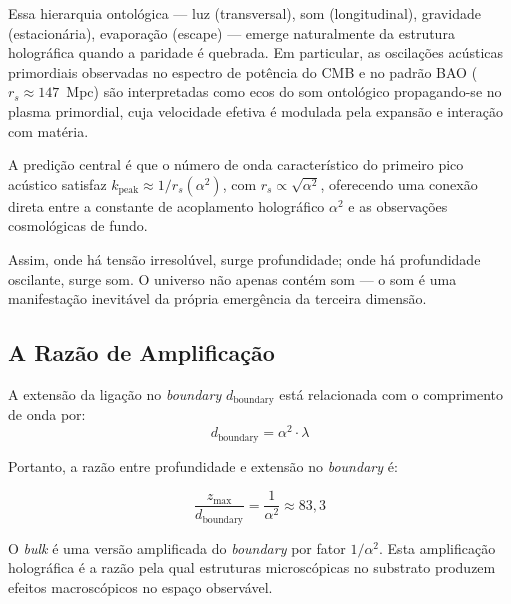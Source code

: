\documentclass[12pt,a4paper,twoside]{article}
\newcommand{\alphaii}{\alpha^{2}}
\newcommand{\boundary}{\textit{boundary}}
\newcommand{\bulk}{\textit{bulk}}
\begin{document}
Essa hierarquia ontol\'ogica --- luz (transversal), som (longitudinal), gravidade (estacion\'aria), evapora\c{c}\~ao (escape) --- emerge naturalmente da estrutura hologr\'afica quando a paridade \'e quebrada. Em particular, as oscila\c{c}\~oes ac\'usticas primordiais observadas no espectro de pot\^encia do CMB e no padr\~ao BAO ($r_s \approx 147$~Mpc) s\~ao interpretadas como ecos do som ontol\'ogico propagando-se no plasma primordial, cuja velocidade efetiva \'e modulada pela expans\~ao e intera\c{c}\~ao com mat\'eria.

A predi\c{c}\~ao central \'e que o n\'umero de onda caracter\'istico do primeiro pico ac\'ustico satisfaz $k_{\text{peak}} \approx 1/r_s(\alphaii)$, com $r_s \propto \sqrt{\alphaii}$, oferecendo uma conex\~ao direta entre a constante de acoplamento hologr\'afico $\alphaii$ e as observa\c{c}\~oes cosmol\'ogicas de fundo.

Assim, onde h\'a tens\~ao irresol\'uvel, surge profundidade; onde h\'a profundidade oscilante, surge som. O universo n\~ao apenas cont\'em som --- o som \'e uma manifesta\c{c}\~ao inevit\'avel da pr\'opria emerg\^encia da terceira dimens\~ao.

\subsection{A Raz\~ao de Amplifica\c{c}\~ao}

A extens\~ao da liga\c{c}\~ao no \boundary{} $d_{\text{boundary}}$ est\'a relacionada com o comprimento de onda por:
\begin{equation}
d_{\text{boundary}} = \alphaii\cdot\lambda
\label{eq:d_boundary}
\end{equation}

Portanto, a raz\~ao entre profundidade e extens\~ao no \boundary{} \'e:
\begin{equationbox}[title={Amplifica\c{c}\~ao Hologr\'afica}]
\begin{equation}
\frac{z_{\max}}{d_{\text{boundary}}} = \frac{1}{\alphaii} \approx 83{,}3
\label{eq:amplificacao}
\end{equation}
\end{equationbox}

\noindent O \bulk{} \'e uma vers\~ao amplificada do \boundary{} por fator $1/\alphaii$. Esta amplifica\c{c}\~ao hologr\'afica \'e a raz\~ao pela qual estruturas microsc\'opicas no substrato produzem efeitos macrosc\'opicos no espa\c{c}o observ\'avel.

\end{document}
